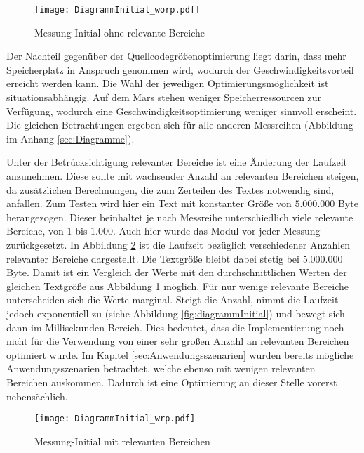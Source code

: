 \begin{figure}[H]
	\centering
	\texttt{[image: DiagrammInitial\_worp.pdf]}
	\label{fig:diagrammInitial_worp}
	\caption{Messung-Initial ohne relevante Bereiche}
\end{figure}

Der Nachteil gegenüber der Quellcodegrößenoptimierung liegt darin, dass
mehr Speicherplatz in Anspruch genommen wird, wodurch der
Geschwindigkeitsvorteil erreicht werden kann.
Die Wahl der jeweiligen Optimierungsmöglichkeit ist situationsabhängig. Auf dem
Mars stehen weniger Speicherressourcen zur Verfügung, wodurch eine
Geschwindigkeitsoptimierung weniger sinnvoll erscheint. Die gleichen
Betrachtungen ergeben sich für alle anderen Messreihen (Abbildung im Anhang
\ref{sec:Diagramme}). 

Unter der Betrücksichtigung relevanter Bereiche ist eine Änderung der Laufzeit
anzunehmen. Diese sollte mit wachsender Anzahl an relevanten Bereichen steigen,
da zusätzlichen Berechnungen, die zum Zerteilen des Textes notwendig sind,
anfallen.
\newline
Zum Testen wird hier ein Text mit konstanter Größe von $5.000.000$ Byte
herangezogen. Dieser beinhaltet je nach Messreihe unterschiedlich viele
relevante Bereiche, von $1$ bis $1.000$. Auch hier wurde das Modul vor jeder
Messung zurückgesetzt.
\newline
In Abbildung \ref{fig:diagrammInitial_wrp} ist die Laufzeit bezüglich
verschiedener Anzahlen relevanter Bereiche dargestellt. Die Textgröße bleibt
dabei stetig bei $5.000.000$ Byte. Damit ist ein Vergleich der Werte mit den
durchschnittlichen Werten der gleichen Textgröße aus Abbildung
\ref{fig:diagrammInitial_worp} möglich. Für nur wenige relevante Bereiche
unterscheiden sich die Werte marginal. Steigt die Anzahl, nimmt die Laufzeit
jedoch exponentiell zu (siehe Abbildung \ref{fig:diagrammInitial}) und bewegt
sich dann im Millisekunden-Bereich. Dies bedeutet, dass die Implementierung noch
nicht für die Verwendung von einer sehr großen Anzahl an relevanten Bereichen
optimiert wurde. Im Kapitel \ref{sec:Anwendungsszenarien} wurden bereits
mögliche Anwendungsszenarien betrachtet, welche ebenso mit wenigen relevanten
Bereichen auskommen. Dadurch ist eine Optimierung an dieser Stelle vorerst
nebensächlich.

\begin{figure}[H]
	\centering
	\texttt{[image: DiagrammInitial\_wrp.pdf]}
	\label{fig:diagrammInitial_wrp}
	\caption{Messung-Initial mit relevanten Bereichen}
\end{figure}

